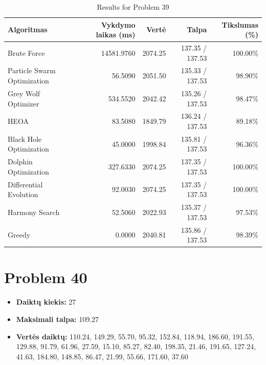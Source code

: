 \documentclass[a4paper,11pt]{article}
\begin{document}
\begin{table}[h!]
\centering
\begin{tabular}{lrrrr}
\toprule
\textbf{Algoritmas} & \textbf{Vykdymo laikas (ms)} & \textbf{Vertė} & \textbf{Talpa} & \textbf{Tikslumas (\%)} \\
\midrule
Brute Force & 14581.9760 & 2074.25 & 137.35 / 137.53 & 100.00\% \\
Particle Swarm Optimization & 56.5090 & 2051.50 & 135.33 / 137.53 & 98.90\% \\
Grey Wolf Optimizer & 534.5520 & 2042.42 & 135.26 / 137.53 & 98.47\% \\
HEOA & 83.5080 & 1849.79 & 136.24 / 137.53 & 89.18\% \\
Black Hole Optimization & 45.0000 & 1998.84 & 135.81 / 137.53 & 96.36\% \\
Dolphin Optimization & 327.6330 & 2074.25 & 137.35 / 137.53 & 100.00\% \\
Differential Evolution & 92.0030 & 2074.25 & 137.35 / 137.53 & 100.00\% \\
Harmony Search & 52.5060 & 2022.93 & 135.37 / 137.53 & 97.53\% \\
Greedy & 0.0000 & 2040.81 & 135.86 / 137.53 & 98.39\% \\
\bottomrule
\end{tabular}
\caption{Results for Problem 39}
\end{table}
\clearpage

\section*{Problem 40}
\begin{itemize}
    \item \textbf{Daiktų kiekis:} 27
    \item \textbf{Maksimali talpa:} 109.27
    \item \textbf{Vertės daiktų:} 110.24, 149.29, 55.70, 95.32, 152.84, 118.94, 186.60, 191.55, 129.88, 91.79, 61.96, 27.59, 15.10, 85.27, 82.40, 198.35, 21.46, 191.65, 127.24, 41.63, 184.80, 148.85, 86.47, 21.99, 55.66, 171.60, 37.60
\end{itemize}
\end{document}

